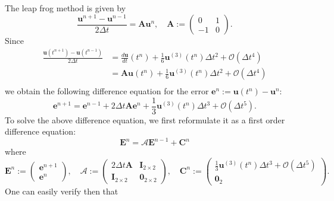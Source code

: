 \documentclass{article}
\begin{document}
\begin{itemize}
The leap frog method is given by
\begin{equation*}
\frac{\mathbf{u}^{n+1} - \mathbf{u}^{n-1}}{2 \Delta t} = \mathbf{A} \mathbf{u}^n, \quad \mathbf{A} := \begin{pmatrix} 0 & 1 \\ -1 & 0 \end{pmatrix}.
\end{equation*}
Since
\begin{align*}
\frac{\mathbf{u} \left( t^{n+1} \right) - \mathbf{u} \left( t^{n-1} \right)}{2 \Delta t}
& = \frac{d \mathbf{u}}{dt} \left( t^n \right) + \frac{1}{6} \mathbf{u}^{(3)} \left( t^n \right) \Delta t^2 + \mathcal{O} \left( \Delta t^4 \right) \\
& = \mathbf{A} \mathbf{u} \left( t^n \right) + \frac{1}{6} \mathbf{u}^{(3)} \left( t^n \right) \Delta t^2 + \mathcal{O} \left( \Delta t^4 \right) \\
\end{align*}
we obtain the following difference equation for the error $\mathbf{e}^n := \mathbf{u} \left( t^n \right) - \mathbf{u}^n$:
\begin{equation*}
\mathbf{e}^{n+1} = \mathbf{e}^{n-1} + 2 \Delta t \mathbf{A} \mathbf{e}^n + \frac{1}{3} \mathbf{u}^{(3)} \left( t^n \right) \Delta t^3 + \mathcal{O} \left( \Delta t^5 \right).
\end{equation*}
To solve the above difference equation, we first reformulate it as a first order difference equation:
\begin{equation*}
\mathbf{E}^n = \mathcal{A} \mathbf{E}^{n-1} + \mathbf{C}^n
\end{equation*}
where
\begin{equation*}
\mathbf{E}^n := \begin{pmatrix} \mathbf{e}^{n+1} \\ \mathbf{e}^n \end{pmatrix}, \quad \mathcal{A} := \begin{pmatrix} 2 \Delta t \mathbf{A} & \mathbf{I}_{2 \times 2} \\ \mathbf{I}_{2 \times 2} & \mathbf{0}_{2 \times 2} \end{pmatrix}, \quad \mathbf{C}^n := \begin{pmatrix} \frac{1}{3} \mathbf{u}^{(3)} \left( t^n \right) \Delta t^3 + \mathcal{O} \left( \Delta t^5 \right) \\ \mathbf{0}_{2} \end{pmatrix}.
\end{equation*}
One can easily verify then that

\end{itemize}
\end{document}
